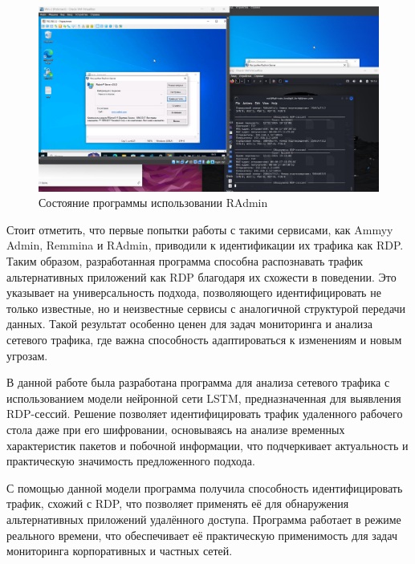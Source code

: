 \documentclass[spec, och, diploma]{SCWorks}
\begin{document}
\begin{figure}[H]
  \centering
  \includegraphics[width=1.0\textwidth]{pics/11radmin.png}
  \caption{Состояние программы использовании RAdmin}
  \label{radmin1}
\end{figure}

Стоит отметить, что первые попытки работы с такими сервисами, как Ammyy Admin, Remmina и RAdmin, приводили к 
идентификации их трафика как RDP. Таким образом, разработанная программа способна распознавать трафик альтернативных 
приложений как RDP благодаря их схожести в поведении. Это указывает на универсальность подхода, позволяющего 
идентифицировать не только известные, но и неизвестные сервисы с аналогичной структурой передачи данных. 
Такой результат особенно ценен для задач мониторинга и анализа сетевого трафика, где важна способность 
адаптироваться к изменениям и новым угрозам.



\conclusion

В данной работе была разработана программа для анализа сетевого трафика с использованием модели нейронной сети LSTM, 
предназначенная для выявления RDP-сессий. Решение позволяет идентифицировать трафик удаленного рабочего стола даже при его шифровании, основываясь 
на анализе временных характеристик пакетов и побочной информации, что подчеркивает актуальность и практическую значимость предложенного подхода.  

С помощью данной модели программа получила способность идентифицировать трафик, схожий с RDP, что 
позволяет применять её для обнаружения альтернативных приложений удалённого доступа. Программа работает в режиме 
реального времени, что обеспечивает её практическую применимость для задач мониторинга корпоративных и частных сетей.
\end{document}
